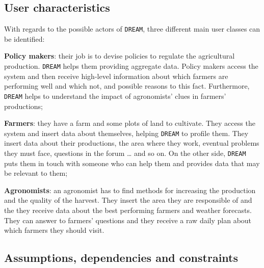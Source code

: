 \documentclass{article}
\begin{document}
\subsection{User characteristics}
With regards to the possible actors of \verb|DREAM|, three different main user classes can be identified:
\begin{description}
\item \textbf{Policy makers}: their job is to devise policies to regulate the agricultural production. \verb|DREAM| helps 
them providing aggregate data. Policy makers access the system and then receive high-level 
information about which farmers are performing well and which not, and possible reasons to this 
fact. Furthermore, \verb|DREAM| helps to understand the impact of agronomists’ clues in farmers’ 
productions;
\item \textbf{Farmers}: they have a farm and some plots of land to cultivate. They access the system and insert 
data about themselves, helping \verb|DREAM| to profile them. They insert data about their productions, 
the area where they work, eventual problems they must face, questions in the forum … and so on. 
On the other side, \verb|DREAM| puts them in touch with someone who can help them and provides data 
that may be relevant to them;
\item \textbf{Agronomists}: an agronomist has to find methods for increasing the production and the quality of 
the harvest. They insert the area they are responsible of and the they receive data about the best 
performing farmers and weather forecasts. They can answer to farmers’ questions and they receive 
a raw daily plan about which farmers they should visit.
\end{description}
\subsection{Assumptions, dependencies and constraints}
\end{document}
